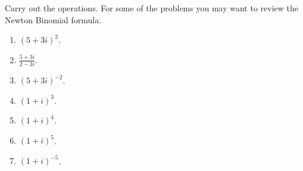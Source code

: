 \label{probComplexNumbersBasicOperations}
Carry out the operations. For some of the problems you may want to review the Newton Binomial formula.
\begin{multicols}{3}
\begin{enumerate}[ref={\fcProblemRef}]
\item $\displaystyle(5+3i)^2$.

\item $\displaystyle\frac{5+3i}{2-3i}$.

\item $(5+3i)^{-2}$.

\item $(1+i)^3$.

\item $(1+i)^4$.

\item \label{eq(1+i)^5} $(1+i)^5$.

\item \label{eq(1+i)^-5} $(1+i)^{-5}$.

\end{enumerate}
\end{multicols}
